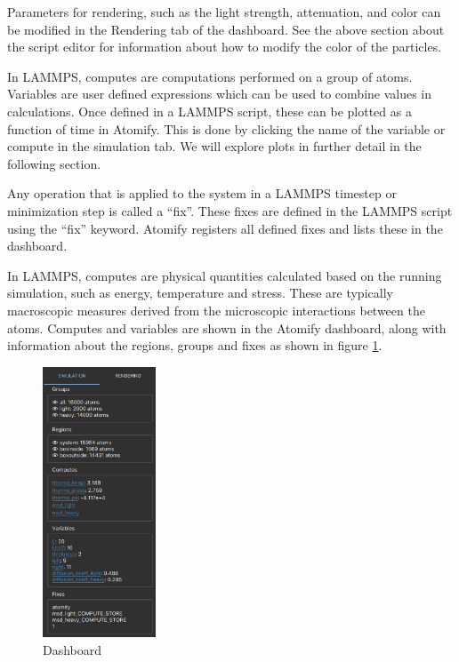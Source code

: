 \documentclass[aps,pre,twocolumn,letterpaper,floatfix,nofootinbib]{revtex4}
\begin{document}
Parameters for rendering, such as the light strength,
attenuation, and color can be modified in the Rendering tab of the dashboard.
See the above section about the script editor for information about how to
modify the color of the particles.

In LAMMPS, computes are computations performed on a group of atoms.
Variables are user defined expressions which can be used to combine values in
calculations.
Once defined in a LAMMPS script, these can be plotted as a function of time in
Atomify.
This is done by clicking the name of the variable or compute in the simulation
tab.
We will explore plots in further detail in the following section.

Any operation that is applied to the system in a LAMMPS timestep or minimization
step is called a ``fix''.
These fixes are defined in the LAMMPS script using the ``fix'' keyword.
Atomify registers all defined fixes and lists these in the dashboard.

In LAMMPS, computes are physical quantities calculated based on the running
simulation, such as energy, temperature and stress.
These are typically macroscopic measures derived from the microscopic
interactions between the atoms.
Computes and variables are shown in the Atomify dashboard,
along with information about the regions, groups and fixes as shown in figure
\ref{fig:dashboard}.

\begin{figure}
	\centering
	\includegraphics[width=0.3\textwidth]{dashboard.png}
	\caption{Dashboard}
	\label{fig:dashboard}
\end{figure}
\end{document}
